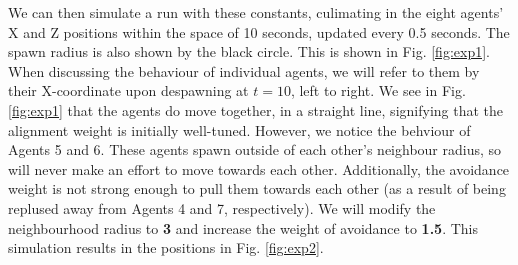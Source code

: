 \documentclass[12pt]{article}
\begin{document}
We can then simulate a run with these constants, culimating in the eight agents' X and Z positions within the space of 10 seconds, updated every 0.5 seconds. The spawn radius is also shown by the black circle. This is shown in Fig. \ref{fig:exp1}. When discussing the behaviour of individual agents, we will refer to them by their X-coordinate upon despawning at $t=10$, left to right. We see in Fig. \ref{fig:exp1} that the agents do move together, in a straight line, signifying that the alignment weight is initially well-tuned. However, we notice the behviour of Agents 5 and 6. These agents spawn outside of each other's neighbour radius, so will never make an effort to move towards each other. Additionally, the avoidance weight is not strong enough to pull them towards each other (as a result of being replused away from Agents 4 and 7, respectively). We will modify the neighbourhood radius to \textbf{3} and increase the weight of avoidance to \textbf{1.5}. This simulation results in the positions in Fig. \ref{fig:exp2}. 
\end{document}
